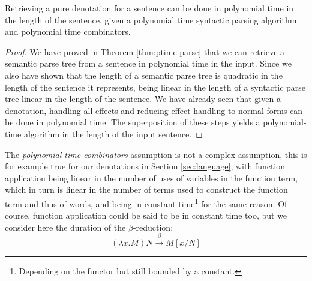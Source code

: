 \begin{thm}
	\label{thm:ptime-denot}
	Retrieving a pure denotation for a sentence can be done in polynomial time in
	the length of the sentence, given a polynomial time syntactic parsing
	algorithm and polynomial time combinators.
\end{thm}
\begin{proof}
	We have proved in Theorem \ref{thm:ptime-parse} that we can retrieve a
	semantic parse tree from a	sentence in polynomial time in the input.
	Since we also have shown that the length of a semantic parse tree is quadratic
	in the length of the sentence it represents, being linear in the length of a
	syntactic parse tree linear in the length of the sentence.
	We have already seen that given a denotation, handling all effects and
	reducing effect handling to normal forms can be done in polynomial time.
	The superposition of these steps yields a polynomial-time algorithm in the
	length of the input sentence.
\end{proof}

The \emph{polynomial time combinators} assumption is not a complex assumption,
this is for example true for our denotations in Section \ref{sec:language},
with function application being linear in the number of uses of variables in
the function term, which in turn is linear in the number of terms used to
construct the function term and thus of words, and \fmap being in constant
time\footnote{Depending on the functor but still bounded by a constant.} for
the same reason.
Of course, function application could be said to be in constant time too, but
we consider here the duration of the $\beta$-reduction:
\begin{equation*}
	\left(\lambda x. M\right)N \xrightarrow{\beta} M\left[x / N\right]
\end{equation*}



